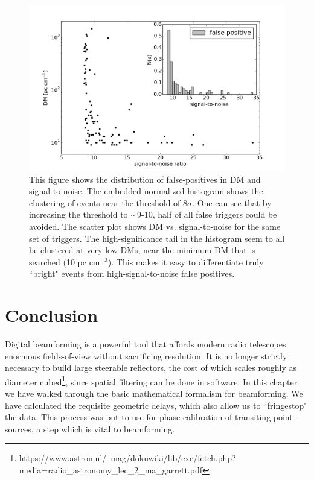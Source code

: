 \begin{figure}[!h]
\begin{center}
\includegraphics[trim={0in 0in 0in 0in}, scale=0.5]
{./figures/beamforming/dm_dist_falsepositives.png}
\vspace{0.0cm}
\caption[abc]{This figure shows the distribution 
     of false-positives in DM and signal-to-noise. The 
     embedded normalized histogram shows the clustering of events 
     near the threshold of 8$\sigma$. One can see that by 
     increasing the threshold to $\sim$9-10, half of all 
     false triggers could be avoided. The scatter plot shows 
     DM vs. signal-to-noise for the same set of triggers. The 
     high-significance tail in the histogram seem to all be clustered 
     at very low DMs, near the minimum DM that is searched 
     (10 pc cm$^{-3}$). This makes it easy to differentiate truly 
     ``bright" events from high-signal-to-noise false positives.}
\end{center}
\label{fig-scatterhist}
\end{figure}

\section{Conclusion}
\label{sec:beamforming_conclusion}

Digital beamforming is a powerful tool that affords modern 
radio telescopes enormous fields-of-view without 
sacrificing resolution. It is no longer strictly necessary 
to build large steerable reflectors, the cost of which scales 
roughly as diameter cubed\footnote{https://www.astron.nl/~mag/dokuwiki/lib/exe/fetch.php?media=radio\_astronomy\_lec\_2\_ma\_garrett.pdf}, 
since spatial filtering can be done in software.
In this chapter 
we have walked through the basic mathematical formalism 
for beamforming. We have calculated the requisite geometric 
delays, which also allow us to ``fringestop" the data. 
This process was 
put to use for phase-calibration of transiting point-sources, 
a step which is vital to beamforming. 

